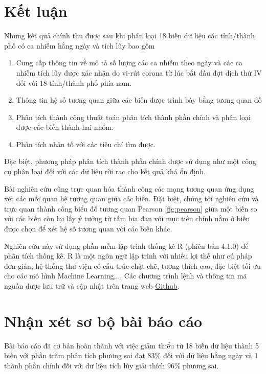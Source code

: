 \documentclass[../thesis.tex]{subfiles}
\begin{document}
\section{Kết luận}

Những kết quả chính thu được sau khi phân loại 18 biến dữ liệu các tỉnh/thành phố có ca nhiễm hằng ngày và tích lũy bao gồm
\begin{enumerate}
	\item Cung cấp thông tin về mô tả số lượng các ca nhiễm theo ngày và các ca nhiễm tích lũy được xác nhận do vi-rút corona từ lúc bắt đầu đợt dịch thứ IV đối với 18 tỉnh/thành phố phía nam.
	\item Thông tin hệ số tương quan giữa các biến được trình bày bằng tương quan đồ
	\item Phân tích thành công thuật toán phân tích thành phần chính và phân loại được các biến thành hai nhóm.
	\item Phân tích nhân tố với các tiêu chí tìm được.
\end{enumerate}

Đặc biệt, phương pháp phân tích thành phần chính được sử dụng như một công cụ phân loại đối với các dữ liệu rời rạc cho kết quả khá ổn định.


Bài nghiên cứu cũng trực quan hóa thành công các mạng tương quan ứng dụng xét các mối quan hệ tương quan giữa các biến. Đặt biệt, chúng tôi nghiên cứu và trực quan thành công biểu đồ tương quan Pearson \ref{fig:pearson} giữa một biến so với các biến còn lại lấy ý tưởng từ tấm bia đạn với mục tiêu chính nằm ở biến được chọn để xét hệ số tương quan với các biến khác. 




Nghiên cứu này sử dụng phần mềm lập trình thống kê R (phiên bản 4.1.0) để phân tích thống kê. R là một ngôn ngữ lập trình với nhiều lợi thế như cú pháp đơn giản, hệ thống thư viện có cấu trúc chặt chẽ, tương thích cao, đặc biệt tối ưu cho các mô hình Machine Learning,$\ldots$ Các chương trình lệnh và thông tin mã nguồn được lưu trữ và cập nhật trên trang web \href{https://github.com/hungtrannam/PCA_For_Covid-19}{Github}.






\section{Nhận xét sơ bộ bài báo cáo}

Bài báo cáo đã cơ bản hoàn thành với việc giảm thiểu từ 18 biến dữ liệu thành 5 biến với phần trăm phân tích phương sai đạt $ 83\% $ đối với dữ liệu hằng ngày và 1 thành phần chính đối với dữ liệu tích lũy giải thích $ 96\% $ phương sai.
\end{document}
